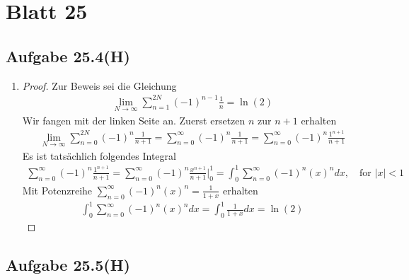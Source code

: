 \documentclass[11pt,a4paper]{article}
\begin{document}
\newpage



\newpage



\newpage

\section*{Blatt 25}

\newpage

\subsection*{Aufgabe 25.4(H)}

\begin{enumerate}

\item[]

\begin{proof}
Zur Beweis sei die Gleichung
\begin{align*}
\lim_{N\rightarrow\infty}\sum_{n=1}^{2N}(-1)^{n-1}\frac{1}{n}=\ln(2)
\end{align*}
Wir fangen mit der linken Seite an. Zuerst ersetzen $n$ zur $n+1$ erhalten
\begin{align*}
\lim_{N\rightarrow\infty}\sum_{n=0}^{2N}(-1)^n\frac{1}{n+1}=\sum_{n=0}^{\infty}(-1)^n\frac{1}{n+1}=\sum_{n=0}^{\infty}(-1)^n\frac{1^{n+1}}{n+1}
\end{align*}
Es ist tatsächlich folgendes Integral
\begin{align*}
\sum_{n=0}^{\infty}(-1)^n\frac{1^{n+1}}{n+1}
=\sum_{n=0}^{\infty}(-1)^n\frac{x^{n+1}}{n+1}\Bigg|^1_0
=\int^1_0\sum_{n=0}^{\infty}(-1)^n(x)^n dx,
\hspace{1em}
\mbox{for }|x|<1
\end{align*}
Mit Potenzreihe $\sum_{n=0}^{\infty}(-1)^n(x)^n=\frac{1}{1+x}$ erhalten
\begin{align*}
\int^1_0\sum_{n=0}^{\infty}(-1)^n(x)^n dx=\int^1_0\frac{1}{1+x} dx=\ln(2)
\end{align*}
\end{proof}

\end{enumerate}

\newpage

\subsection*{Aufgabe 25.5(H)}
\end{document}
